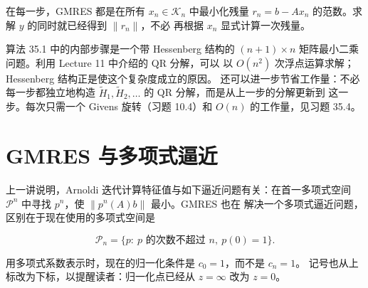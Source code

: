 \documentclass[UTF8,fontset=none,12pt]{ctexart}
\begin{document}
\begin{center}
\end{center}

在每一步，GMRES 都是在所有 $x_n\in\mathcal K_n$ 中最小化残量
$r_n=b-Ax_n$ 的范数。求解 $y$ 的同时就已经得到 $\lVert r_n\rVert$，不必
再根据 $x_n$ 显式计算一次残量。

算法 35.1 中的内部步骤是一个带 Hessenberg 结构的
$(n+1)\times n$ 矩阵最小二乘问题。利用 Lecture 11 中介绍的 QR 分解，可以
以 $O(n^2)$ 次浮点运算求解；Hessenberg 结构正是使这个复杂度成立的原因。
还可以进一步节省工作量：不必每一步都独立地构造
$\widetilde H_1,\widetilde H_2,\ldots$ 的 QR 分解，而是从上一步的分解更新到
这一步。每次只需一个 Givens 旋转（习题 10.4）和 $O(n)$ 的工作量，见习题
35.4。

\section*{GMRES 与多项式逼近}

上一讲说明，Arnoldi 迭代计算特征值与如下逼近问题有关：在首一多项式空间
$\mathcal P^n$ 中寻找 $p^n$，使 $\lVert p^n(A)b\rVert$ 最小。GMRES 也在
解决一个多项式逼近问题，区别在于现在使用的多项式空间是

\begin{equation}
\mathcal P_n=
\{p:\ p\text{ 的次数不超过 }n,\ p(0)=1\}.
\tag{35.7}
\end{equation}

用多项式系数表示时，现在的归一化条件是 $c_0=1$，而不是 $c_n=1$。
记号也从上标改为下标，以提醒读者：归一化点已经从 $z=\infty$ 改为
$z=0$。
\end{document}
